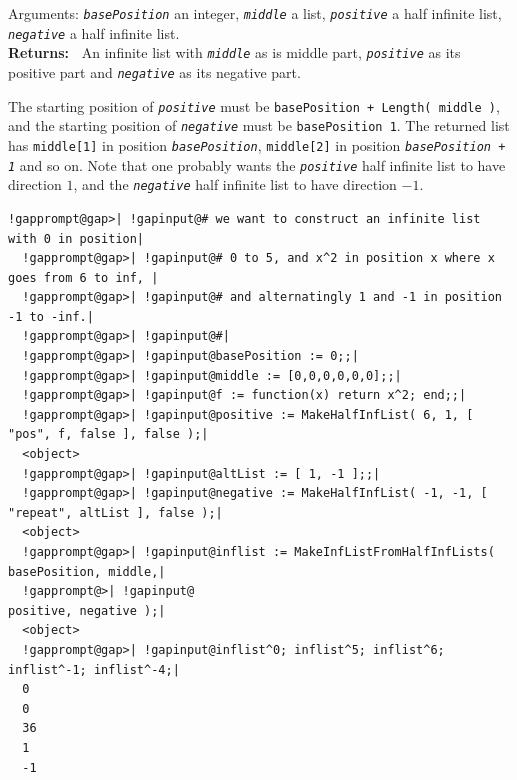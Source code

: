 \documentclass[a4paper,11pt]{report}
\begin{document}
{{{ Arguments: \mbox{\texttt{\mdseries\slshape basePosition}} \texttt{}\texttt{} an integer, \mbox{\texttt{\mdseries\slshape middle}} \texttt{}\texttt{} a list, \mbox{\texttt{\mdseries\slshape positive}} \texttt{}\texttt{} a half infinite list, \mbox{\texttt{\mdseries\slshape negative}} \texttt{}\texttt{} a half infinite list. \\
 \textbf{\indent Returns:\ }
An infinite list with \mbox{\texttt{\mdseries\slshape middle}} as is middle part, \mbox{\texttt{\mdseries\slshape positive}} as its positive part and \mbox{\texttt{\mdseries\slshape negative}} as its negative part.



 The starting position of \mbox{\texttt{\mdseries\slshape positive}} must be \texttt{basePosition + Length( middle )}, and the starting position of \mbox{\texttt{\mdseries\slshape negative}} must be \texttt{basePosition \texttt{} 1}. The returned list has \texttt{middle[1]} in position \mbox{\texttt{\mdseries\slshape basePosition}}, \texttt{middle[2]} in position \mbox{\texttt{\mdseries\slshape basePosition + 1}} and so on. Note that one probably wants the \mbox{\texttt{\mdseries\slshape positive}} half infinite list to have direction $1$, and the \mbox{\texttt{\mdseries\slshape negative}} half infinite list to have direction $-1$. }

 
\begin{Verbatim}[commandchars=!@|,fontsize=\small,frame=single,label=Example]
  !gapprompt@gap>| !gapinput@# we want to construct an infinite list with 0 in position|
  !gapprompt@gap>| !gapinput@# 0 to 5, and x^2 in position x where x goes from 6 to inf, |
  !gapprompt@gap>| !gapinput@# and alternatingly 1 and -1 in position -1 to -inf.|
  !gapprompt@gap>| !gapinput@#|
  !gapprompt@gap>| !gapinput@basePosition := 0;;|
  !gapprompt@gap>| !gapinput@middle := [0,0,0,0,0,0];;|
  !gapprompt@gap>| !gapinput@f := function(x) return x^2; end;;|
  !gapprompt@gap>| !gapinput@positive := MakeHalfInfList( 6, 1, [ "pos", f, false ], false );|
  <object>
  !gapprompt@gap>| !gapinput@altList := [ 1, -1 ];;|
  !gapprompt@gap>| !gapinput@negative := MakeHalfInfList( -1, -1, [ "repeat", altList ], false );|
  <object>
  !gapprompt@gap>| !gapinput@inflist := MakeInfListFromHalfInfLists( basePosition, middle,|
  !gapprompt@>| !gapinput@                                           positive, negative );|
  <object>
  !gapprompt@gap>| !gapinput@inflist^0; inflist^5; inflist^6; inflist^-1; inflist^-4;|
  0
  0
  36
  1
  -1 
\end{Verbatim}
 

}}
\end{document}
